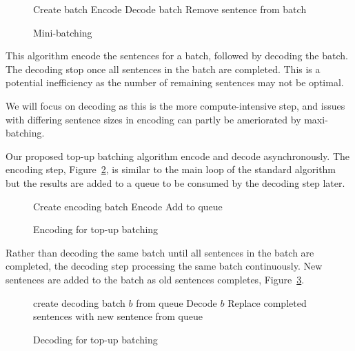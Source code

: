 \documentclass[]{article}
\begin{document}
\begin{figure} [h]
\begin{algorithmic}
  \STATE Create batch
  \STATE Encode
    \STATE Decode batch
        \STATE Remove sentence from batch
      \ENDIF
    \ENDFOR
  \ENDWHILE
\ENDWHILE 
\end{algorithmic}
\caption{Mini-batching}
\label{algo:Mini-batching}
\end{figure}

This algorithm encode the sentences for a batch, followed by decoding the batch. The decoding stop once all sentences in the batch are completed. This is a potential inefficiency as the number of remaining sentences may not be optimal.

We will focus on decoding as this is the more compute-intensive step, and issues with differing sentence sizes in encoding can partly be ameriorated by maxi-batching.

Our proposed top-up batching algorithm encode and decode asynchronously. The encoding step, Figure~\ref{algo:Encoding for top-up batching}, is similar to the main loop of the standard algorithm but the results are added to a queue to be consumed by the decoding step later.

\begin{figure} [h]
\begin{algorithmic}
  \STATE Create encoding batch
  \STATE Encode
  \STATE Add to queue
\ENDWHILE 
\end{algorithmic}
\caption{Encoding for top-up batching}
\label{algo:Encoding for top-up batching}
\end{figure}

Rather than decoding the same batch until all sentences in the batch are completed, the decoding step processing the same batch continuously. New sentences are added to the batch as old sentences completes, Figure~\ref{algo:Decoding for top-up batching}.

\begin{figure} [h]
\begin{algorithmic}
\STATE create decoding batch $b$ from queue
  \STATE Decode $b$
  \STATE Replace completed sentences with new sentence from queue
\ENDWHILE 
\end{algorithmic}
\caption{Decoding for top-up batching}
\label{algo:Decoding for top-up batching}
\end{figure}
\end{document}
